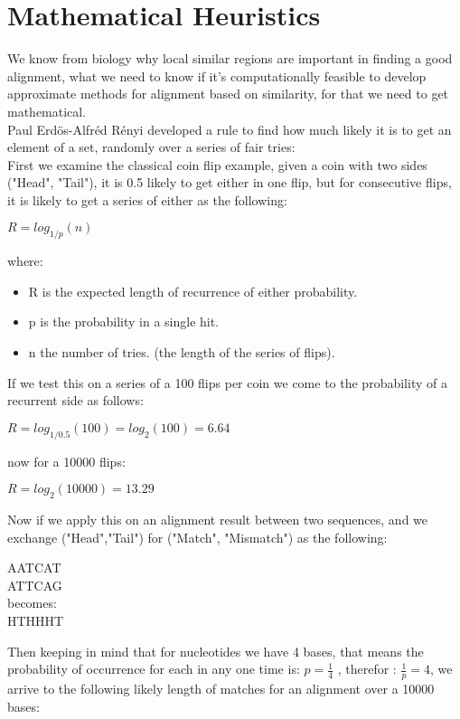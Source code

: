 \documentclass[12pt]{report}
\begin{document}
	\section{\textbf{Mathematical Heuristics}\cite{dgraur}} 
	We know from biology why local similar regions are important in finding a good alignment, what we need to know if it's computationally feasible to develop approximate methods for alignment based on similarity, for that we need to get mathematical.\\
	Paul Erdös-Alfréd Rényi developed a rule to find how much likely it is to get an element of a set, randomly over a series of fair tries:\\
	First we examine the classical coin flip example, given a coin with two sides ("Head", "Tail"), it is 0.5 likely to get either in one flip, but for consecutive flips, it is likely to get a series of either as the following:\\
	\begin{center}
		$ R = log_{1/p} (n) $ \\
	\end{center}
			where: \begin{itemize}
				\item R is the expected length of recurrence of either probability.
				\item p is the probability in a single hit.
				\item n the number of tries. (the length of the series of flips).
			\end{itemize} 
	If we test this on a series of a 100 flips per coin we come to the probability of a recurrent side as follows:
	\begin{center}
		$ R = log_{1/0.5} (100) = log_{2}(100) = 6.64 $
	\end{center}
	now for a 10000 flips:
		\begin{center}
			$ R = log_{2}(10000) = 13.29 $
		\end{center}
		\newpage
	Now if we apply this on an alignment result between two sequences, and we exchange ("Head","Tail") for ("Match", "Mismatch") as the following:
	\begin{center}
		AATCAT \\
		ATTCAG \\
	becomes: \\
		HTHHHT
	\end{center}
	Then keeping in mind that for nucleotides we have 4 bases, that means the probability of occurrence for each in any one time is: $ p = \frac{1}{4} $ , therefor : $ \frac{1}{p} = 4 $, we arrive to the following likely length of matches for an alignment over a 10000 bases:
\end{document}
